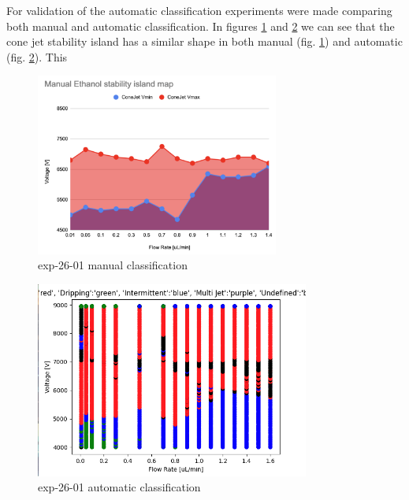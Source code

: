     For validation of the automatic classification experiments were made comparing both manual and automatic classification.
    In figures \ref{fig:stability_2} and \ref{fig:stability_3} we can see that the cone jet stability island has a similar shape in both manual (fig. \ref{fig:stability_2}) and automatic (fig. \ref{fig:stability_3}). This 

    \begin{multicols}{2}


        \begin{figure}[H]
            \center
            \includegraphics[width=8cm]{Figuras/april/manual_stability.png}
            \caption{ exp-26-01 manual classification}
            \label{fig:stability_2}
        \end{figure}

        \begin{figure}[H]
            \center
            \includegraphics[width=9cm]{Figuras/report3/map-exp-26-01.png}
            \caption{ exp-26-01 automatic classification}
            \label{fig:stability_3}
        \end{figure}

    \end{multicols}

